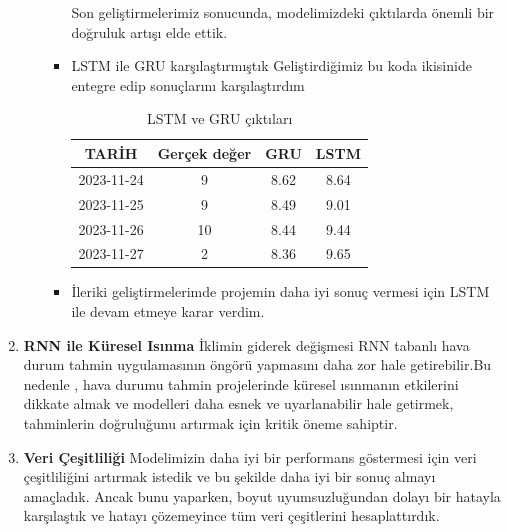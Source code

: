 \documentclass[12pt,a4paper]{article}
\begin{document}
\begin{enumerate}
\begin{itemize}
\begin{itemize}
Son geliştirmelerimiz sonucunda, modelimizdeki çıktılarda önemli bir doğruluk artışı elde ettik. 



\item LSTM ile GRU karşılaştırmıştık Geliştirdiğimiz bu koda ikisinide entegre edip sonuçlarını karşılaştırdım 

\begin{table}[h!]
\centering
\caption{LSTM ve GRU çıktıları}
\begin{tabular}{|c|c|c|c|}
\hline
\textbf{TARİH} & \textbf{Gerçek değer} & \textbf{GRU} & \textbf{LSTM} \\
\hline
2023-11-24 & 9    & 8.62  & 8.64 \\
\hline
2023-11-25 & 9    & 8.49  & 9.01 \\
\hline
2023-11-26 & 10   & 8.44  & 9.44 \\
\hline
2023-11-27 & 2    & 8.36  & 9.65 \\
\hline
\end{tabular}
\end{table}

\item 
İleriki geliştirmelerimde projemin daha iyi sonuç vermesi için LSTM ile devam etmeye karar verdim.
\end{itemize}
\end{itemize}

  \item {\bf\fontsize{12pt}{14pt}\selectfont RNN ile Küresel Isınma }\newline\newline
  İklimin giderek değişmesi RNN tabanlı hava durum tahmin uygulamasının öngörü yapmasını daha zor hale getirebilir.Bu nedenle , hava durumu tahmin projelerinde küresel ısınmanın etkilerini dikkate almak ve modelleri daha esnek ve uyarlanabilir hale getirmek, tahminlerin doğruluğunu artırmak için kritik öneme sahiptir\cite{mgm_hava_iklim}.

\item {\bf\fontsize{12pt}{14pt}\selectfont Veri Çeşitliliği }\newline\newline
Modelimizin daha iyi bir performans göstermesi için veri çeşitliliğini artırmak istedik ve bu şekilde daha iyi bir sonuç almayı amaçladık. Ancak bunu yaparken, boyut uyumsuzluğundan dolayı bir hatayla karşılaştık ve hatayı çözemeyince tüm veri çeşitlerini hesaplattırdık.


\end{enumerate}
\end{document}
